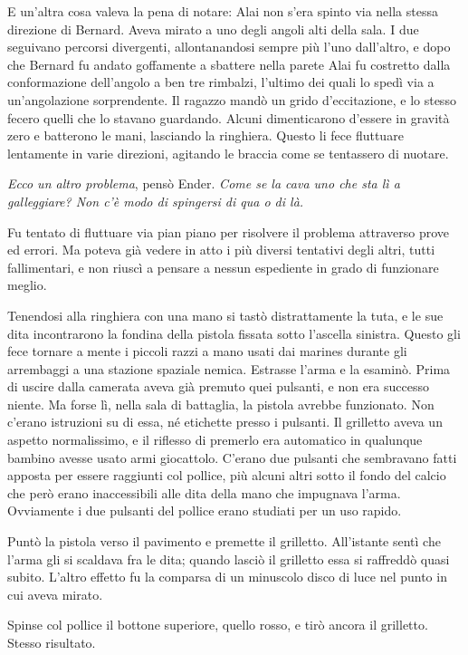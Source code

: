 {E un'altra cosa valeva la pena di notare: Alai non s'era spinto via
	nella stessa direzione di Bernard. Aveva mirato a uno degli angoli alti
	della sala. I due seguivano percorsi divergenti, allontanandosi sempre
	più l'uno dall'altro, e dopo che Bernard fu andato goffamente a sbattere
	nella parete Alai fu costretto dalla conformazione dell'angolo a ben tre
	rimbalzi, l'ultimo dei quali lo spedì via a un'angolazione sorprendente.
	Il ragazzo mandò un grido d'eccitazione, e lo stesso fecero quelli che
	lo stavano guardando. Alcuni dimenticarono d'essere in gravità zero e
	batterono le mani, lasciando la ringhiera. Questo li fece fluttuare
	lentamente in varie direzioni, agitando le braccia come se tentassero di
	nuotare.}

\emph{{Ecco un altro problema}}{, \emph{} pensò Ender. \emph{Come se la
		cava uno che sta lì a galleggiare? Non c'è modo di spingersi di qua o di
		là.}}

{Fu tentato di fluttuare via pian piano per risolvere il problema
	attraverso prove ed errori. Ma poteva già vedere in atto i più diversi
	tentativi degli altri, tutti fallimentari, e non riuscì a pensare a
	nessun espediente in grado di funzionare meglio.}

{Tenendosi alla ringhiera con una mano si tastò distrattamente la tuta,
	e le sue dita incontrarono la fondina della pistola fissata sotto
	l'ascella sinistra. Questo gli fece tornare a mente i piccoli razzi a
	mano usati dai marines durante gli arrembaggi a una stazione spaziale
	nemica. Estrasse l'arma e la esaminò. Prima di uscire dalla camerata
	aveva già premuto quei pulsanti, e non era successo niente. Ma forse lì,
	nella sala di battaglia, la pistola avrebbe funzionato. Non c'erano
	istruzioni su di essa, né etichette presso i pulsanti. Il grilletto
	aveva un aspetto normalissimo, e il riflesso di premerlo era automatico
	in qualunque bambino avesse usato armi giocattolo. C'erano due pulsanti
	che sembravano fatti apposta per essere raggiunti col pollice, più
	alcuni altri sotto il fondo del calcio che però erano inaccessibili alle
	dita della mano che impugnava l'arma. Ovviamente i due pulsanti del
	pollice erano studiati per un uso rapido.}

{Puntò la pistola verso il pavimento e premette il grilletto.
	All'istante sentì che l'arma gli si scaldava fra le dita; quando lasciò
	il grilletto essa si raffreddò quasi subito. L'altro effetto fu la
	comparsa di un minuscolo disco di luce nel punto in cui aveva mirato.}

{Spinse col pollice il bottone superiore, quello rosso, e tirò ancora il
	grilletto. Stesso risultato.}

